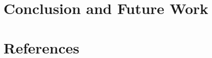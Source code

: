 \documentclass{sig-alternate}
\begin{document}
\section{Conclusion and Future Work}

\section{References}

\subsection{}


	





	
\end{document}
